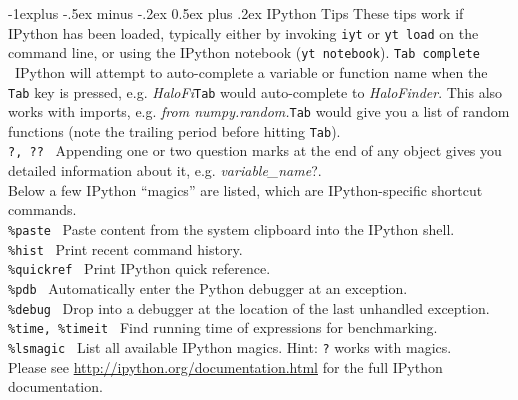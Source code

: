 \documentclass[10pt,landscape]{article}
\makeatletter
\renewcommand{\subsection}{\@startsection{subsection}{2}{0mm}%
                                {-1explus -.5ex minus -.2ex}%
                                {0.5ex plus .2ex}%
                                {\normalfont\normalsize\bfseries}}
\makeatother
\begin{document}
\begin{multicols}{3}
\subsection{IPython Tips}
These tips work if IPython has been loaded, typically either by invoking
\texttt{iyt} or \texttt{yt load} on the command line, or using the IPython notebook (\texttt{yt notebook}).
\texttt{Tab complete} \textemdash\ IPython will attempt to auto-complete a
variable or function name when the \texttt{Tab} key is pressed, e.g. \textit{HaloFi}\textendash\texttt{Tab} would auto-complete
to \textit{HaloFinder}. This also works with imports, e.g. \textit{from numpy.random.}\textendash\texttt{Tab}
would give you a list of random functions (note the trailing period before hitting \texttt{Tab}).\\
\texttt{?, ??} \textemdash\ Appending one or two question marks at the end of any object gives you
detailed information about it, e.g. \textit{variable\_name}?.\\
Below a few IPython ``magics'' are listed, which are IPython-specific shortcut commands.\\
\texttt{\%paste} \textemdash\ Paste content from the system clipboard into the IPython shell.\\
\texttt{\%hist} \textemdash\ Print recent command history.\\
\texttt{\%quickref} \textemdash\ Print IPython quick reference.\\
\texttt{\%pdb} \textemdash\ Automatically enter the Python debugger at an exception.\\
\texttt{\%debug} \textemdash\ Drop into a debugger at the location of the last unhandled exception. \\
\texttt{\%time, \%timeit} \textemdash\ Find running time of expressions for benchmarking.\\
\texttt{\%lsmagic} \textemdash\ List all available IPython magics. Hint: \texttt{?} works with magics.\\


Please see \url{http://ipython.org/documentation.html} for the full
IPython documentation.


\end{multicols}
\end{document}

